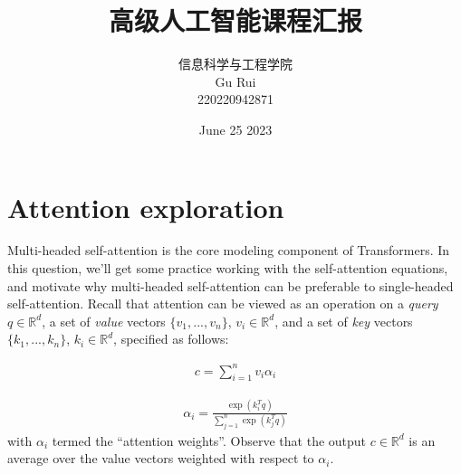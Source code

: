 \documentclass[letterpaper,12pt]{article}
\begin{document}
	
	
	\title{\songti {}高级人工智能课程汇报}
	\author{信息科学与工程学院 \\ \textrm{Gu Rui} \\ 220220942871}
	\date{\textrm{June 25  2023}}
	\maketitle
	
	\renewcommand{\figurename}{Figure} %
	\renewcommand{\contentsname}{Contents}
	\renewcommand{\tablename}{Table}
	\tableofcontents  %
	
	\section{Attention exploration}
	
	Multi-headed self-attention is the core modeling component of Transformers. In this question, we’ll get some practice working with the self-attention equations, and motivate why multi-headed self-attention can be preferable to single-headed self-attention.
	Recall that attention can be viewed as an operation on a \textit{query} $q \in \mathbb{R}^d$, a set of \textit{value} vectors $\{v_1, . . . , v_n \}$, $v_i \in
	\mathbb{R}^d$, and a set of \textit{key} vectors $\{k_1, . . . , k_n\}$, $k_i \in \mathbb{R}^d$, specified as follows:
	
	\begin{equation}
		\begin{aligned}
			c = \sum_{i=1}^{n} v_{i}\alpha_{i}
		\end{aligned}
		\label{eq: Attention_formula_1}
	\end{equation}
	
	\begin{equation}
		\begin{aligned}
			\alpha_{i} = \frac{\exp(k_{i}^{T}q)}{\sum_{j=1}^{n} \exp(k_{j}^{T}q)}
		\end{aligned}
		\label{eq: Attention_formula_2}
	\end{equation}
	with $α_i$ termed the “attention weights”. Observe that the output $c \in \mathbb{R}^d$
	is an average over the value vectors weighted with respect to $α_i$.
	
\end{document}

